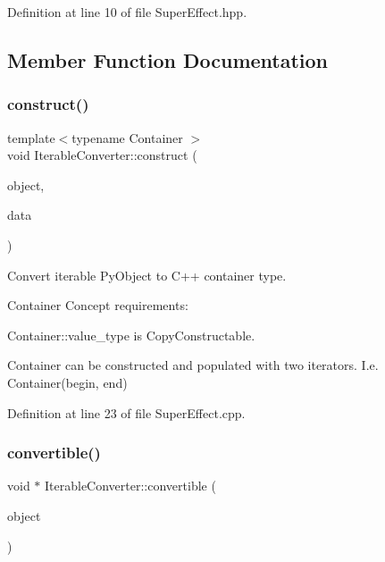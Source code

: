 Definition at line 10 of file Super\+Effect.\+hpp.



\subsection{Member Function Documentation}
\mbox{\label{class_iterable_converter_a34fe9c6bdff8d7bdf9abf9dd59c760a6}} 
\subsubsection{\texorpdfstring{construct()}{construct()}}
{\footnotesize\ttfamily template$<$typename Container $>$ \\
void Iterable\+Converter\+::construct (\begin{DoxyParamCaption}\item[{Py\+Object $\ast$}]{object,  }\item[{bp\+::converter\+::rvalue\+\_\+from\+\_\+python\+\_\+stage1\+\_\+data $\ast$}]{data }\end{DoxyParamCaption})\hspace{0.3cm}{\ttfamily [static]}}



Convert iterable Py\+Object to C++ container type. 

Container Concept requirements\+:


\begin{DoxyItemize}
\item Container\+::value\+\_\+type is Copy\+Constructable.
\item Container can be constructed and populated with two iterators. I.\+e. Container(begin, end) 
\end{DoxyItemize}

Definition at line 23 of file Super\+Effect.\+cpp.

\mbox{\label{class_iterable_converter_a75ed48406a2b25b9020d0644eb0984c0}} 
\subsubsection{\texorpdfstring{convertible()}{convertible()}}
{\footnotesize\ttfamily void $\ast$ Iterable\+Converter\+::convertible (\begin{DoxyParamCaption}\item[{Py\+Object $\ast$}]{object }\end{DoxyParamCaption})\hspace{0.3cm}{\ttfamily [static]}}



